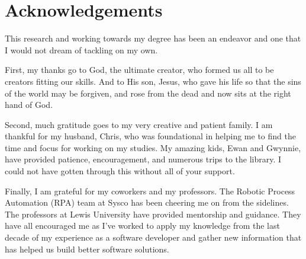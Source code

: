 \section*{Acknowledgements} \label{sectionAcknowledgements}

This research and working towards my degree has been an endeavor and one that I would not dream of tackling on my own.

First, my thanks go to God, the ultimate creator, who formed us all to be creators fitting our skills. And to His son, Jesus, who gave his life so that the sins of the world may be forgiven, and rose from the dead and now sits at the right hand of God.

Second, much gratitude goes to my very creative and patient family. I am thankful for my husband, Chris, who was foundational in helping me to find the time and focus for working on my studies. My amazing kids, Ewan and Gwynnie, have provided patience, encouragement, and numerous trips to the library. I could not have gotten through this without all of your support.

Finally, I am grateful for my coworkers and my professors. The Robotic Process Automation (RPA) team at Sysco has been cheering me on from the sidelines. The professors at Lewis University have provided mentorship and guidance. They have all encouraged me as I've worked to apply my knowledge from the last decade of my experience as a software developer and gather new information that has helped us build better software solutions.

